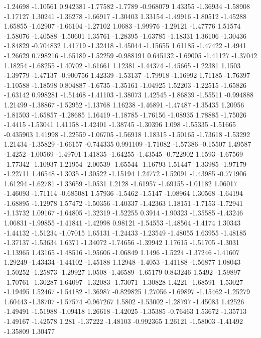 \documentclass[9pt]{article}
\theoremstyle{plain}
\theoremstyle{definition}
\theoremstyle{remark}
\numberwithin{equation}{section}
\begin{document}
-1.24698
-1.10561
0.942381
-1.77582
-1.7789
-0.968079
1.43355
-1.36934
-1.58908
-1.17127
1.30241
-1.36278
-1.66917
-1.30403
1.33154
-1.49916
-1.80512
-1.45288
1.65855
-1.62907
-1.66104
-1.27102
1.0683
-1.99976
-1.29121
-1.47776
1.51574
-1.58076
-1.40588
-1.50601
1.35761
-1.28395
-1.63785
-1.18331
1.36106
-1.30436
-1.84829
-0.704832
1.41719
-1.32418
-1.45044
-1.15655
1.61185
-1.47422
-1.4941
-1.26629
0.798216
-1.65189
-1.52259
-0.988191
0.645132
-1.69005
-1.41127
-1.37042
1.18254
-1.68255
-1.40702
-1.61661
1.12381
-1.44374
-1.45665
-1.22381
1.1503
-1.39779
-1.47137
-0.900756
1.42339
-1.53137
-1.79918
-1.16992
1.71185
-1.76397
-1.10588
-1.18598
0.804887
-1.6735
-1.35161
-1.04925
1.52203
-1.22515
-1.65826
-1.63142
0.998281
-1.51468
-1.41103
-1.38073
1.42545
-1.86839
-1.55511
-0.994888
1.21499
-1.38867
-1.52952
-1.13768
1.16238
-1.46891
-1.47487
-1.35435
1.20956
-1.81503
-1.65857
-1.28685
1.16419
-1.18785
-1.76156
-1.08935
1.78885
-1.75026
-1.4415
-1.53041
1.41158
-1.42401
-1.38745
-1.30396
1.098
-1.55335
-1.51665
-0.435903
1.41998
-1.22559
-1.06705
-1.56918
1.18315
-1.50165
-1.73618
-1.53292
1.21434
-1.35829
-1.66157
-0.744335
0.991109
-1.71082
-1.57386
-0.15507
1.49587
-1.4252
-1.00569
-1.49701
1.41835
-1.64255
-1.43545
-0.722902
1.1593
-1.67569
-1.77342
-1.10937
1.21954
-2.00539
-1.65544
-1.16793
1.51447
-1.33985
-1.97179
-1.22711
1.46548
-1.3035
-1.30522
-1.15194
1.24772
-1.52091
-1.43985
-0.771906
1.61294
-1.62781
-1.33659
-1.0531
1.2128
-1.61957
-1.69155
-1.01182
1.06017
-1.46093
-1.71114
-0.685081
1.57936
-1.5462
-1.5147
-1.08964
1.30568
-1.64194
-1.68895
-1.12978
1.57472
-1.50356
-1.40337
-1.42363
1.18151
-1.7153
-1.72941
-1.13732
1.09167
-1.64805
-1.32319
-1.52255
0.3914
-1.90323
-1.35585
-1.43246
1.06831
-1.99855
-1.41841
-1.42998
0.98121
-1.54553
-1.48564
-1.4174
1.30343
-1.44132
-1.51234
-1.07015
1.65131
-1.24433
-1.23549
-1.48055
1.63955
-1.48185
-1.37137
-1.53634
1.6371
-1.34072
-1.74656
-1.39942
1.17615
-1.51705
-1.3031
-1.13965
1.43165
-1.48516
-1.95606
-1.06849
1.1496
-1.5224
-1.37246
-1.41607
1.29249
-1.43434
-1.44102
-1.45188
1.12948
-1.4053
-1.41188
-1.56877
1.08043
-1.50252
-1.25873
-1.29927
1.0508
-1.46589
-1.65179
0.843246
1.5492
-1.59897
-1.70761
-1.30287
1.64097
-1.32083
-1.73071
-1.30828
1.4221
-1.68591
-1.53027
-1.19495
1.52467
-1.54182
-1.36987
-0.829825
1.27056
-1.69897
-1.15462
-1.25279
1.60443
-1.38707
-1.57574
-0.967267
1.5802
-1.53002
-1.28797
-1.45083
1.42526
-1.49491
-1.51988
-1.09418
1.26618
-1.42025
-1.35385
-0.76463
1.53672
-1.35713
-1.49167
-1.42578
1.281
-1.37222
-1.48103
-0.992365
1.26121
-1.58003
-1.41492
-1.35809
1.30477
\end{document}
